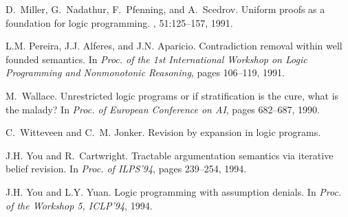 \begin{thebibliography}{10}
D.~Miller, G.~Nadathur, F.~Pfenning, and A.~Scedrov.
\newblock Uniform proofs as a foundation for logic programming.
, 51:125--157, 1991.

L.M. Pereira, J.J. Alferes, and J.N. Aparicio.
\newblock Contradiction removal within well founded semantics.
\newblock In {\em Proc. of the 1st International Workshop on Logic Programming
  and Nonmonotonic Reasoning}, pages 106--119, 1991.

M.~Wallace.
\newblock Unrestricted logic programs or if stratification is the cure, what is
  the malady?
\newblock In {\em Proc. of European Conference on AI}, pages 682--687, 1990.

C.~Witteveen and C.~M. Jonker.
\newblock Revision by expansion in logic programs.

J.H. You and R.~Cartwright.
\newblock Tractable argumentation semantics via iterative belief revision.
\newblock In {\em Proc. of ILPS'94}, pages 239--254, 1994.

J.H. You and L.Y. Yuan.
\newblock Logic programming with assumption denials.
\newblock In {\em Proc. of the Workshop 5, ICLP'94}, 1994.

\end{thebibliography}


